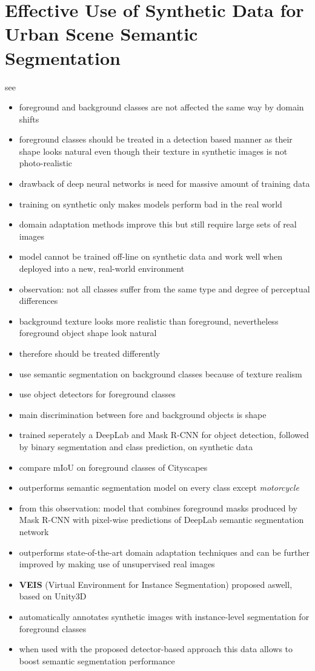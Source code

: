 \section{Effective Use of Synthetic Data for Urban Scene Semantic Segmentation}

see \cite{DBLP:journals/corr/abs-1807-06132}

\begin{itemize}
	\item foreground and background classes are not affected the same way by domain shifts
	\item foreground classes should be treated in a detection based manner as their shape looks natural even though their texture in synthetic images is not photo-realistic
	\item drawback of deep neural networks is need for massive amount of training data
	\item training on synthetic only makes models perform bad in the real world
	\item domain adaptation methods improve this but still require large sets of real images
	\item model cannot be trained off-line on synthetic data and work well when deployed into a new, real-world environment
	\item observation: not all classes suffer from the same type and degree of perceptual differences
	\item background texture looks more realistic than foreground, nevertheless foreground object shape look natural
	\item therefore should be treated differently
	\item use semantic segmentation on background classes because of texture realism
	\item use object detectors for foreground classes
	\item main discrimination between fore and background objects is shape
	\item trained seperately a DeepLab and Mask R-CNN  for object detection, followed by binary segmentation and class prediction, on synthetic data
	\item compare mIoU on foreground classes of Cityscapes
	\item outperforms semantic segmentation model on every class except \textit{motorcycle}
	\item from this observation: model that combines foreground masks produced by Mask R-CNN with pixel-wise predictions of DeepLab semantic segmentation network
	\item outperforms state-of-the-art domain adaptation techniques and can be further improved by making use of unsupervised real images
	\item \textbf{VEIS} (Virtual Environment for Instance Segmentation) proposed aswell, based on Unity3D
	\item automatically annotates synthetic images with instance-level segmentation for foreground classes
	\item when used with the proposed detector-based approach this data allows to boost semantic segmentation performance
\end{itemize}

